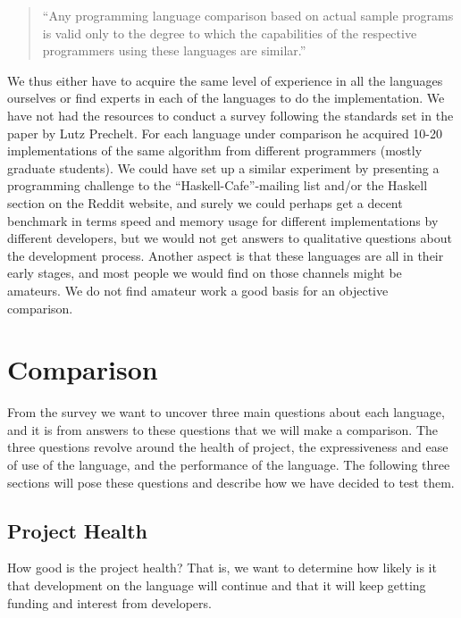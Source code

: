 \begin{quote}
  ``Any programming language comparison based on actual sample programs
  is valid only to the degree to which the capabilities of the
  respective programmers using these languages are similar.''
\end{quote}

We thus either have to acquire the same level of experience in all the
languages ourselves or find experts in each of the languages to do the
implementation. We have not had the resources to conduct a survey
following the standards set in the paper by Lutz Prechelt. For each
language under comparison he acquired 10-20 implementations of the
same algorithm from different programmers (mostly graduate
students). We could have set up a similar experiment by presenting a
programming challenge to the ``Haskell-Cafe''-mailing list and/or the
Haskell section on the Reddit website, and surely we could perhaps get
a decent benchmark in terms speed and memory usage for different
implementations by different developers, but we would not get answers
to qualitative questions about the development process. Another aspect
is that these languages are all in their early stages, and most people
we would find on those channels might be amateurs. We do not find
amateur work a good basis for an objective comparison.


\section{Comparison}
From the survey we want to uncover three main questions about each
language, and it is from answers to these questions that we will make
a comparison. The three questions revolve around the health of
project, the expressiveness and ease of use of the language, and the
performance of the language. The following three sections will pose
these questions and describe how we have decided to test them.


\subsection{Project Health}
How good is the project health? That is,
we want to determine how likely is it that development on the language
will continue and that it will keep getting funding and interest from
developers.

